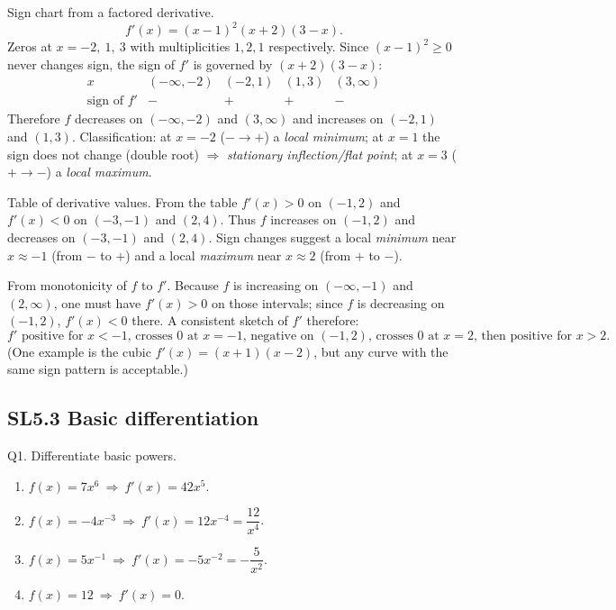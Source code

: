\documentclass[11pt]{article}
\def\textbf#1{#1}%
\newcommand{\tocsubsection}[1]{\subsection{#1}}
\begin{document}
\begin{solution}
\textbf{Sign chart from a factored derivative.}
\[
f'(x)=(x-1)^{2}(x+2)(3-x).
\]
Zeros at $x=-2,\ 1,\ 3$ with multiplicities $1,2,1$ respectively.  Since $(x-1)^2\ge 0$ never changes sign, the sign of $f'$ is governed by $(x+2)(3-x)$:
\[
\begin{array}{c|cccc}
x & (-\infty,-2) & (-2,1) & (1,3) & (3,\infty)\\ \hline
\text{sign of } f' & - & + & + & -
\end{array}
\]
Therefore $f$ decreases on $(-\infty,-2)$ and $(3,\infty)$ and increases on $(-2,1)$ and $(1,3)$.  
Classification: at $x=-2$ ($-\to+$) a \emph{local minimum}; at $x=1$ the sign does not change (double root) $\Rightarrow$ \emph{stationary inflection/flat point}; at $x=3$ ($+\to-$) a \emph{local maximum}.
\end{solution}

\begin{solution}
\textbf{Table of derivative values.}
From the table $f'(x)>0$ on $(-1,2)$ and $f'(x)<0$ on $(-3,-1)$ and $(2,4)$.  
Thus $f$ increases on $(-1,2)$ and decreases on $(-3,-1)$ and $(2,4)$.  
Sign changes suggest a local \emph{minimum} near $x\approx -1$ (from $-$ to $+$) and a local \emph{maximum} near $x\approx 2$ (from $+$ to $-$).
\end{solution}

\begin{solution}
\textbf{From monotonicity of $f$ to $f'$.}
Because $f$ is increasing on $(-\infty,-1)$ and $(2,\infty)$, one must have $f'(x)>0$ on those intervals; since $f$ is decreasing on $(-1,2)$, $f'(x)<0$ there.  
A consistent sketch of $f'$ therefore:
\[
\text{$f'$ positive for $x<-1$, crosses $0$ at $x=-1$, negative on $(-1,2)$, crosses $0$ at $x=2$, then positive for $x>2$.}
\]
(One example is the cubic $f'(x)=(x+1)(x-2)$, but any curve with the same sign pattern is acceptable.)
\end{solution}


\tocsubsection{SL5.3 Basic differentiation}


\begin{solution}
\textbf{Q1. Differentiate basic powers.}
\begin{enumerate}
  \item $f(x)=7x^{6}\ \Rightarrow\ f'(x)=\boxed{42x^{5}}$.
  \item $f(x)=-4x^{-3}\ \Rightarrow\ f'(x)=\boxed{12x^{-4}}=\dfrac{12}{x^{4}}$.
  \item $f(x)=5x^{-1}\ \Rightarrow\ f'(x)=\boxed{-5x^{-2}}=-\dfrac{5}{x^{2}}$.
  \item $f(x)=12\ \Rightarrow\ f'(x)=\boxed{0}$.
\end{enumerate}
\end{solution}
\end{document}
